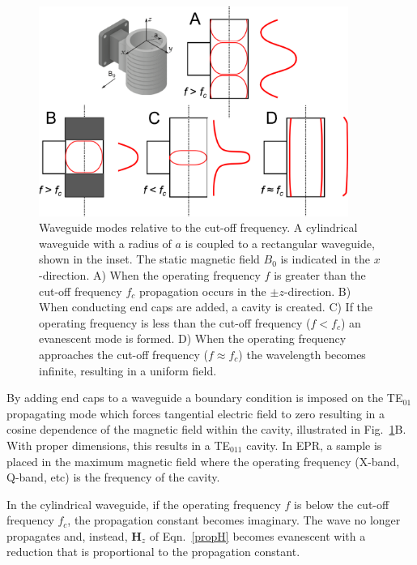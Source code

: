 \begin{figure}[ht]
 \centering
 \includegraphics[width=0.9\textwidth]{Kapitel/Ch2-Images/Ch2-UniformFieldWaveguide.eps}
 \caption[Waveguide modes relative to the cut-off frequency]{Waveguide modes relative to the cut-off frequency. A cylindrical waveguide with a radius of $a$ is coupled to a rectangular waveguide, shown in the inset. The static magnetic field $B_0$ is indicated in the $x$-direction. A) When the operating frequency $f$ is greater than the cut-off frequency $f_c$ propagation occurs in the $\pm z$-direction. B) When conducting end caps are added, a cavity is created. C) If the operating frequency is less than the cut-off frequency ($f < f_c$) an evanescent mode is formed. D) When the operating frequency approaches the cut-off frequency ($f \approx f_c$) the wavelength becomes infinite, resulting in a uniform field. }
 \label{fig:UFwaveguide}
\end{figure}

By adding end caps to a waveguide a boundary condition is imposed on the TE$_{01}$ propagating mode which forces tangential electric field to zero resulting in a cosine dependence of the magnetic field within the cavity, illustrated in Fig.~\ref{fig:UFwaveguide}B. With proper dimensions, this results in a TE$_{011}$ cavity. In EPR, a sample is placed in the maximum magnetic field where the operating frequency (X-band, Q-band, etc) is the frequency of the cavity. 

In the cylindrical waveguide, if the operating frequency $f$ is below the cut-off frequency $f_c$, the propagation constant becomes imaginary. The wave no longer propagates and, instead, $\mathbf{H}_z$ of Eqn.~\ref{propH} becomes evanescent with a reduction that is proportional to the propagation constant. 

